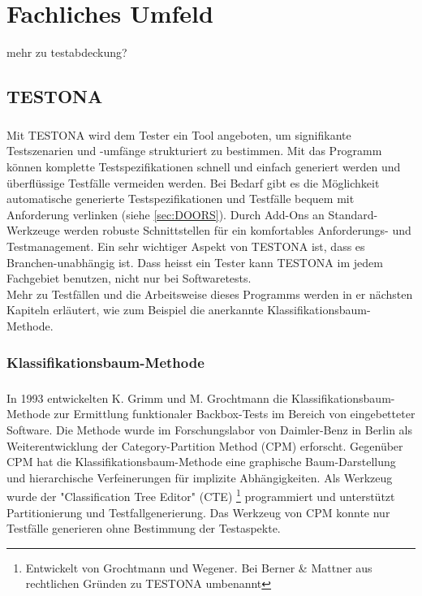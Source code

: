 \chapter{Fachliches Umfeld}\label{chp:fachlichesumfeld}

mehr zu testabdeckung?

\section{TESTONA}\label{sec:Testona} 
\paragraph{}

Mit TESTONA wird dem Tester ein Tool angeboten, um signifikante Testszenarien und -umfänge strukturiert zu bestimmen. Mit das Programm können komplette Testspezifikationen schnell und einfach generiert werden und überflüssige Testfälle vermeiden werden. Bei Bedarf gibt es die Möglichkeit automatische generierte Testspezifikationen und Testfälle bequem mit Anforderung verlinken (siehe \ref{sec:DOORS}). Durch Add-Ons an Standard-Werkzeuge werden robuste Schnittstellen für ein komfortables Anforderungs- und Testmanagement. Ein sehr wichtiger Aspekt von TESTONA ist, dass es Branchen-unabhängig ist. Dass heisst ein Tester kann TESTONA im jedem Fachgebiet benutzen, nicht nur bei Softwaretests.\\

Mehr zu Testfällen und die Arbeitsweise dieses Programms werden in er nächsten Kapiteln erläutert, wie zum Beispiel die anerkannte Klassifikationsbaum-Methode.



\subsection{Klassifikationsbaum-Methode}\label{ssec:KM}
\paragraph{}
In 1993 entwickelten K. Grimm und M. Grochtmann die Klassifikationsbaum-Methode zur Ermittlung funktionaler Backbox-Tests im Bereich von eingebetteter Software. Die Methode wurde im Forschungslabor von Daimler-Benz in Berlin als Weiterentwicklung der Category-Partition Method (CPM) erforscht. Gegenüber CPM hat die Klassifikationsbaum-Methode eine graphische Baum-Darstellung und hierarchische Verfeinerungen für implizite Abhängigkeiten. Als Werkzeug wurde der "Classification Tree Editor" (CTE) \footnote{Entwickelt von Grochtmann und Wegener\cite{TestCaseDesign}. Bei Berner  \& Mattner aus rechtlichen Gründen zu TESTONA umbenannt} programmiert und unterstützt Partitionierung und Testfallgenerierung. Das Werkzeug von CPM konnte nur Testfälle generieren ohne Bestimmung der Testaspekte\cite{ClassificationTrees}.


